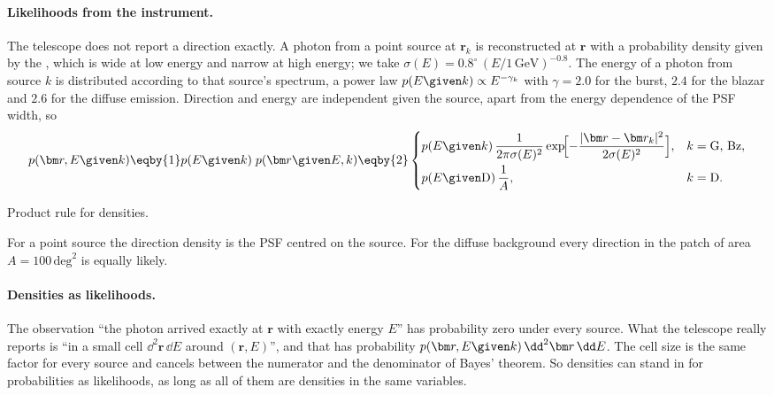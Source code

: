 \paragraph{Likelihoods from the instrument.}
The telescope does not report a direction exactly. A photon from a point source at
$\bm r_k$ is reconstructed at $\bm r$ with a probability density given by the
 , which is wide at low energy
and narrow at high energy; we take $\sigma(E)=0.8^\circ\,(E/1\,\text{GeV})^{-0.8}$. The
energy of a photon from source $k$ is distributed according to that source's spectrum,
a power law $p(E\given k)\propto E^{-\gamma_k}$ with $\gamma=2.0$ for the burst,
$2.4$ for the blazar and $2.6$ for the diffuse emission. Direction and energy are
independent given the source, apart from the energy dependence of the PSF width, so
\begin{align}
  p(\bm r,E\given k)
  \eqby{1}p(E\given k)\;p(\bm r\given E,k)
  \eqby{2}
  \begin{cases}
    p(E\given k)\,\dfrac{1}{2\pi\sigma(E)^2}
      \exp\!\Bigl[-\dfrac{|\bm r-\bm r_k|^2}{2\sigma(E)^2}\Bigr],
      & k=\text{G, Bz},\\[3mm]
    p(E\given \text{D})\,\dfrac{1}{A}, & k=\text{D}.
  \end{cases}
  \label{5a:eq:grb-like}
\end{align}
\begin{explain}
  \item Product rule for densities.
  \item For a point source the direction density is the PSF centred on the source.
        For the diffuse background every direction in the patch of area $A=100\,\text{deg}^2$
        is equally likely.
\end{explain}

\paragraph{Densities as likelihoods.}
The observation ``the photon arrived exactly at $\bm r$ with exactly energy $E$'' has
probability zero under every source. What the telescope really reports is ``in a
small cell $\dd^2\bm r\,\dd E$ around $(\bm r,E)$'', and that has probability
$p(\bm r,E\given k)\,\dd^2\bm r\,\dd E$. The cell size is the same factor for every
source and cancels between the numerator and the denominator of Bayes' theorem. So
densities can stand in for probabilities as likelihoods, as long as all of them are
densities in the same variables.

